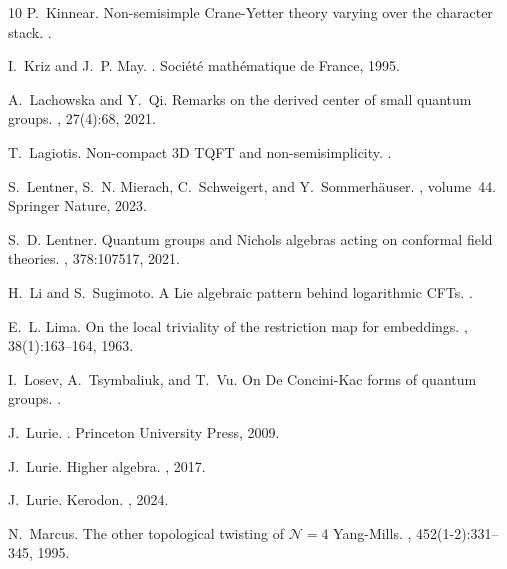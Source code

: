 \documentclass[reqno]{amsart}
\theoremstyle{definition}
\renewcommand{\1}{\mathbf{1}}
\begin{document}
\begin{thebibliography}{10}
P.~Kinnear.
\newblock Non-semisimple {C}rane-{Y}etter theory varying over the character
  stack.
.

I.~Kriz and J.~P. May.
.
\newblock Soci{\'e}t{\'e} math{\'e}matique de France, 1995.

A.~Lachowska and Y.~Qi.
\newblock Remarks on the derived center of small quantum groups.
, 27(4):68, 2021.

T.~Lagiotis.
\newblock Non-compact {3D} {TQFT} and non-semisimplicity.
.

S.~Lentner, S.~N. Mierach, C.~Schweigert, and Y.~Sommerh{\"a}user.
, volume~44.
\newblock Springer Nature, 2023.

S.~D. Lentner.
\newblock Quantum groups and {N}ichols algebras acting on conformal field
  theories.
, 378:107517, 2021.

H.~Li and S.~Sugimoto.
\newblock A {L}ie algebraic pattern behind logarithmic {CFT}s.
.

E.~L. Lima.
\newblock On the local triviality of the restriction map for embeddings.
, 38(1):163--164, 1963.

I.~Losev, A.~Tsymbaliuk, and T.~Vu.
\newblock On {D}e {C}oncini-{K}ac forms of quantum groups.
.

J.~Lurie.
.
\newblock Princeton University Press, 2009.

J.~Lurie.
\newblock Higher algebra.
,
  2017.

J.~Lurie.
\newblock Kerodon.
, 2024.

N.~Marcus.
\newblock The other topological twisting of $\mathcal{N}= 4$ {Y}ang-{M}ills.
, 452(1-2):331--345, 1995.


\end{thebibliography}
\end{document}
